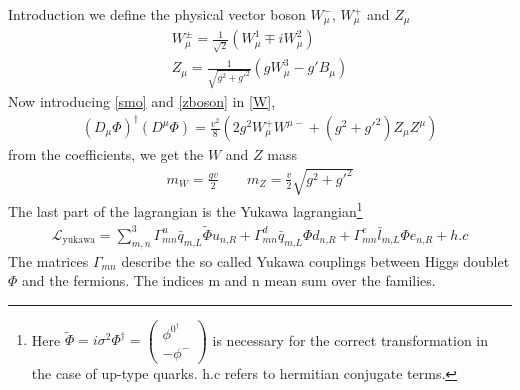 \begin{chapter}{Introduction}
we define the physical vector boson $W^-_\mu$, $W^+_\mu$ and $Z_\mu$ 
\begin{align} 
W^{\pm}_\mu=\frac{1}{\sqrt{2}} (W^1_\mu \mp iW^2_\mu) \label{smo}\\ 
Z_\mu=\frac{1}{\sqrt{g^2+g'^2}}\left(gW^3_\mu -g'B_\mu  \right) \label{zboson}
\end{align}
 Now introducing \ref{smo} and \ref{zboson} in \ref{W},
\begin{align}
(D_\mu \Phi)^\dagger (D^\mu \Phi)=\frac{v^2}{8}\left(2g^2 W_\mu^+ W^{\mu-} + (g^2+g'^2)Z_\mu Z^\mu \right) 
\end{align}
from the coefficients, we get the $W$ and $Z$ mass 
\begin{align}
m_W=\frac{gv}{2} \qquad m_Z=\frac{v}{2}\sqrt{g^2+g'^2}
\end{align}
The last part of the lagrangian is the Yukawa lagrangian\footnote{Here $
	\tilde{\Phi}=i\sigma^2 \Phi^\dagger =\left(\begin{array}{c}
	\phi^{0^\dagger} \\
	-\phi^-
	\end{array} \right)
	$ is necessary for the correct transformation in the case of up-type quarks. 
	h.c refers to hermitian conjugate terms. } 
\begin{align}
\mathcal{L}_\text{yukawa}=\sum_{m,n}^{3}  \Gamma^u_{mn}\bar{q}_{m\text{,}L} \tilde{\Phi} u_{n\text{,}R}+\Gamma^d_{mn}\bar{q}_{m\text{,}L} \Phi d_{n\text{,}R}+\Gamma^e_{mn}\bar{l}_{m\text{,}L} \Phi e_{n\text{,}R}+h.c
\end{align}
The matrices $\Gamma_{mn}$ describe the so called Yukawa couplings between Higgs doublet $\Phi$ and the fermions. The indices m and n mean sum over the families. 

\end{chapter}
